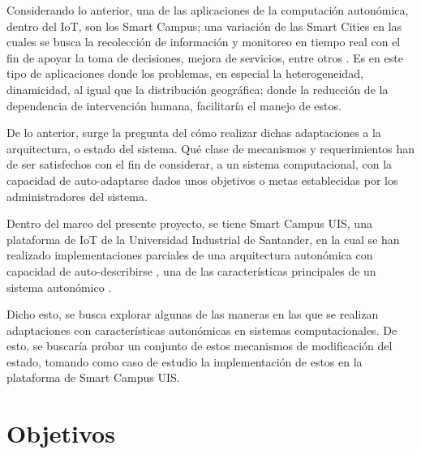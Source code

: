\documentclass[12pt]{article}
\begin{document}
    Considerando lo anterior, una de las aplicaciones de la computación autonómica, dentro del IoT, son los Smart Campus; una variación de las Smart Cities en las cuales se busca la recolección de información y monitoreo en tiempo real con el fin de apoyar la toma de decisiones, mejora de servicios, entre otros \cite{MinAllah2020}. Es en este tipo de aplicaciones donde los problemas, en especial la heterogeneidad, dinamicidad, al igual que la distribución geográfica; donde la reducción de la dependencia de intervención humana, facilitaría el manejo de estos. 


    De lo anterior, surge la pregunta del cómo realizar dichas adaptaciones a la arquitectura, o estado del sistema. Qué clase de mecanismos y requerimientos han de ser satisfechos con el fin de considerar, a un sistema computacional, con la capacidad de auto-adaptarse dados unos objetivos o metas establecidas por los administradores del sistema.
    

    

    Dentro del marco del presente proyecto, se tiene Smart Campus UIS, una plataforma de IoT de la Universidad Industrial de Santander, en la cual se han realizado implementaciones parciales de una arquitectura autonómica con capacidad de auto-describirse \cite{msc_henry_2022}, una de las características principales de un sistema autonómico \cite{horn_2001}. 
    
    Dicho esto, se busca explorar algunas de las maneras en las que se realizan adaptaciones con características autonómicas en sistemas computacionales. De esto, se buscaría probar un conjunto de estos mecanismos de modificación del estado, tomando como caso de estudio la implementación de estos en la plataforma de Smart Campus UIS.



    \section{Objetivos}
\end{document}
